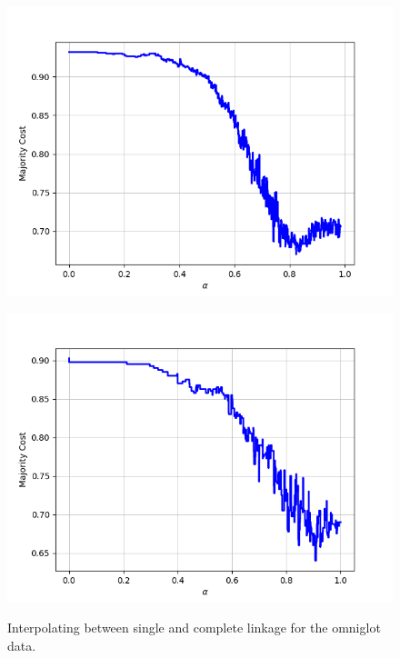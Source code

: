 \begin{figure}[H]
\begin{minipage}{.24\textwidth}
  {\includegraphics[width=\linewidth]{plots/omniglot-intra-sc/Tagalog}}
\end{minipage}
\begin{minipage}{.24\textwidth}
  \centering
  {\includegraphics[width=\linewidth]{plots/omniglot-intra-sc/Tifinagh}}
\end{minipage}
\caption{%
  Interpolating between single and complete linkage for the omniglot data.}
\label{}
\end{figure}

